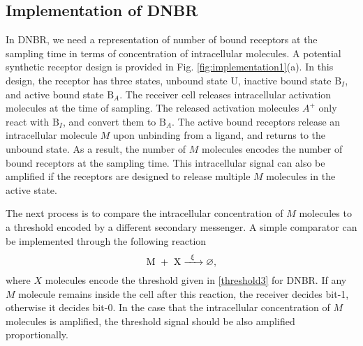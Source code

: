 \documentclass[twocolumn]{IEEEtran}
\newcommand{\B}{\mathrm{B}}
\newcommand{\U}{\mathrm{U}}
\begin{document}

\subsection{Implementation of DNBR}
In DNBR, we need a representation of number of bound receptors at the sampling time in terms of concentration of intracellular molecules. A potential synthetic receptor design is provided in Fig. \ref{fig:implementation1}(a). In this design, the receptor has three states, unbound state $\U$, inactive bound state $\B_I$, and active bound state $\B_A$. The receiver cell releases intracellular activation molecules at the time of sampling. The released activation molecules $A^+$ only react with $\B_I$, and convert them to $\B_A$. The active bound receptors release an intracellular molecule $M$ upon unbinding from a ligand, and returns to the unbound state. As a result, the number of $M$ molecules encodes the number of bound receptors at the sampling time. This intracellular signal can also be amplified if the receptors are designed to release multiple $M$ molecules in the active state. 

The next process is to compare the intracellular concentration of $M$ molecules to a threshold encoded by a different secondary messenger. A simple comparator can be implemented through the following reaction
\begin{equation}
\ce{ {M + X} ->[{\xi}] {\varnothing} }, 
\end{equation}
where $X$ molecules encode the threshold given in \eqref{threshold3} for DNBR. If any $M$ molecule remains inside the cell after this reaction, the receiver decides bit-1, otherwise it decides bit-0. In the case that the intracellular concentration of $M$ molecules is amplified, the threshold signal should be also amplified proportionally.  

\end{document}
